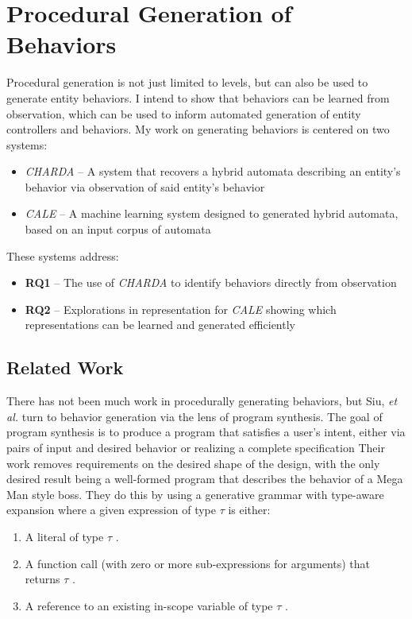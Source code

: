 \documentclass[12pt]{report}
\begin{document}
\chapter*{Procedural Generation of Behaviors}

Procedural generation is not just limited to levels, but can also be used to generate entity behaviors.  I intend to show that behaviors can be learned from observation, which can be used to inform automated generation of entity controllers and behaviors. My work on generating behaviors is centered on two systems: 
\begin{itemize}
\item \textit{CHARDA} -- A system that recovers a hybrid automata describing an entity's behavior via observation of said entity's behavior
\item \textit{CALE} -- A machine learning system designed to generated hybrid automata, based on an input corpus of automata
\end{itemize}

These systems address:


\begin{itemize}
\item \textbf{RQ1} -- The use of \textit{CHARDA} to identify behaviors directly from observation
\item \textbf{RQ2} -- Explorations in representation for \textit{CALE} showing which representations can be learned and generated efficiently
\end{itemize}


\section*{Related Work}

There has not been much work in procedurally generating behaviors, but Siu, \textit{et al.} \cite{programsynthesis} turn to behavior generation via the lens of program synthesis. The goal of program synthesis is to produce a program that satisfies a user's intent, either via pairs of input and desired behavior \cite{Oleksandr Polozov and Sumit Gulwani. 2015. FlashMeta: A framework for
inductive program synthesis} or realizing a complete specification \cite{Eric Schkufza, Rahul Sharma, and Alex Aiken. 2013. Stochastic Superoptimization.} Their work removes requirements on the desired shape of the design, with the only desired result being a well-formed program that describes the behavior of a Mega Man style boss.  They do this by using a generative grammar with type-aware expansion where a given expression of type $\tau$ is either:
\begin{enumerate}
\item A literal of type $\tau$ .
\item A function call (with zero or more sub-expressions for
arguments) that returns $\tau$ .
\item A reference to an existing in-scope variable of type $\tau$ .
\end{enumerate}
\end{document}
